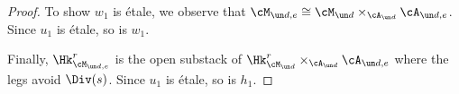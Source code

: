 \begin{proof}
To show $w_{1}$ is \'etale, we observe that $\cM_{\un d,e}\cong \cM_{\un d}\times_{\cA_{\un d}}\cA_{\un d,e}$. Since $u_{1}$ is \'etale, so is $w_{1}$.



Finally,  $\Hk^{r}_{\cM_{\un d,e}}$ is the open substack of $\Hk^{r}_{\cM_{\un d}}\times_{\cA_{\un d}}\cA_{\un d,e}$  where the legs avoid $\Div(s)$. Since $u_{1}$ is \'etale,  so is $h_{1}$.
\end{proof}


